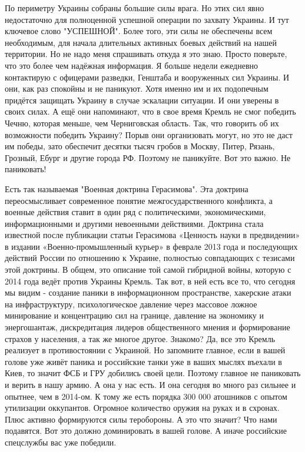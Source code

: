 По периметру Украины собраны большие силы врага. Но этих сил явно недостаточно
для полноценной успешной операции по захвату Украины. И тут ключевое слово
"УСПЕШНОЙ". Более того, эти силы не обеспечены всем необходимым, для начала
длительных активных боевых действий на нашей территории. Но не надо меня
спрашивать откуда я это знаю. Просто поверьте, что это более чем надёжная
информация. Я больше недели ежедневно контактирую с офицерами разведки,
Генштаба и вооруженных сил Украины. И они, как раз спокойны и не паникуют. Хотя
именно им и их подопечным придётся защищать Украину в случае эскалации
ситуации. И они уверены в своих силах. А ещё они напоминают, что в свое время
Кремль не смог победить Чечню, которая меньше, чем Черниговская область. Так,
что говорить об их возможности победить Украину? Порыв они организовать могут,
но это не даст им победы, зато обеспечит десятки тысяч гробов в Москву, Питер,
Рязань, Грозный, Ебург и другие города РФ. Поэтому не паникуйте. Вот это важно.
Не паниковать!

Есть так называемая "Военная доктрина Герасимова". Эта доктрина переосмысливает
современное понятие межгосударственного конфликта, а военные действия ставит в
один ряд с политическими, экономическими, информационными и другими невоенными
действиями. Доктрина стала известной после публикации статьи Герасимова
«Ценность науки в предвидении» в издании «Военно-промышленный курьер» в феврале
2013 года и последующих действий России по отношению к Украине, полностью
совпадающих с тезисами этой доктрины. В общем, это описание той самой гибридной
войны, которую с 2014 года ведёт против Украины Кремль. Так вот, в ней есть все
то, что сегодня мы видим - создание паники в информационном пространстве,
хакерские атаки на инфраструктуру, психологическое давление через массовое
ложное минирование и концентрацию сил на границе, давление на экономику и
энергошантаж, дискредитация лидеров общественного мнения и формирование страхов
у населения, а так же многое другое. Знакомо? Да, все это Кремль реализует в
противостоянии с Украиной. Но запомните главное, если в вашей голове уже живёт
паника и российские танки уже в ваших мыслях въехали в Киев, то значит ФСБ и
ГРУ добились своей цели. Поэтому главное не паниковать и верить в нашу армию. А
она у нас есть. И она сегодня во много раз сильнее и опытнее, чем в 2014-ом. К
тому же есть порядка 300 000 атошников с опытом утилизации оккупантов. Огромное
количество оружия на руках и в схронах. Плюс активно формируются силы
теробороны. А это что значит? Что нами подавятся. Вот это должно доминировать в
вашей голове. А иначе российские спецслужбы вас уже победили. 


